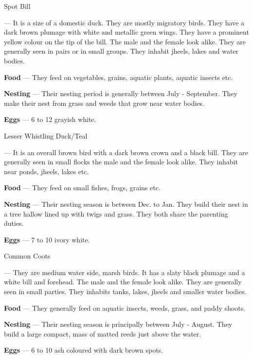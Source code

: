 \begin{bird}{Spot Bill}

 --- It is a size of a domestic duck. They are mostly migratory birds. They have a dark brown plumage with white and metallic green wings. They have a prominent yellow colour on the tip of the bill. The male and the female look alike. They are generally seen in pairs or in small groups. They inhabit jheels, lakes and water bodies.

{\large\bf Food} --- They feed on vegetables, grains, aquatic plants, aquatic insects etc.

{\large\bf Nesting} --- Their nesting period is generally between July - September. They make their nest from grass and weeds that grow near water bodies. 

{\large\bf Eggs} --- 6 to 12 grayish white.
\end{bird}

\begin{bird}{Lesser Whistling Duck/Teal}

 --- It is an overall brown bird with a dark brown crown and a black bill. They are generally seen in small flocks the male and the female look alike. They inhabit near ponds, jheels, lakes etc. 

{\large\bf Food} --- They feed on small fishes, frogs, grains etc.

{\large\bf Nesting} --- Their nesting season is between Dec. to Jan. They build their nest in a tree hallow lined up with twigs and grass. They both share the parenting duties.

{\large\bf Eggs} --- 7 to 10 ivory white.
\end{bird}

\begin{bird}{Common Coots}

 --- They are medium water side, marsh birds. It has a slaty black plumage and a white bill and forehead. The male and the female look alike. They are generally seen in small parties. They inhabits tanks, lakes, jheels and smaller water bodies. 

{\large\bf Food} --- They generally feed on aquatic insects, weeds, grass, and paddy shoots. 

{\large\bf Nesting} --- Their nesting season is principally between July - August. They build a large compact, mass of matted reeds just above the water.

{\bf Eggs} --- 6 to 10 ash coloured with dark brown spots.
\end{bird}


